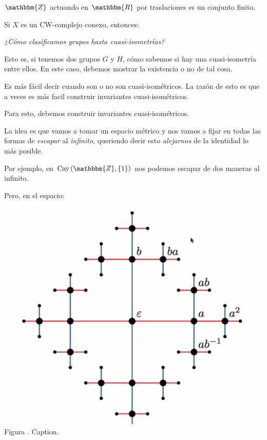 \documentclass[12pt]{report}
\newcounter{it}
\theoremstyle{largebreak}
\newcommand{\bbm}[1]{\ensuremath{\mathbbm{#1}}}
\newcounter{figcount}
\newcommand{\Cay}[1]{\ensuremath{\textup{Cay}\left(#1\right)}}
\begin{document}
    \begin{exa}
        $\bbm{Z}$ actuando en $\bbm{R}$ por traslaciones es un conjunto finito.
    \end{exa}

    \begin{exa}
        Si $X$ es un CW-complejo conexo, entonces:
    \end{exa}

    \begin{center}
        \textit{¿Cómo clasificamos grupos hasta cuasi-isometrías?}
    \end{center}

    Esto es, si tenemos dos grupos $G$ y $H$, cómo sabemos si hay una cuasi-isometría entre ellos. En este caso, debemos mostrar la existencia o no de tal cosa.

    Es más fácil decir cuando son o no son cuasi-isométricos. La razón de esto es que a veces es más facil construir invariantes cuasi-isométricos.

    Para esto, debemos construir invariantes cuasi-isométricos.

    La idea es que vamos a tomar un espacio métrico y nos vamos a fijar en todas las formas de \textit{escapar} al \textit{infinito}, queriendo decir esto \textit{alejarnos} de la identidad lo más posible.

    Por ejemplo, en $\Cay{\bbm{Z},\left\{1\right\}}$ nos podemos escapar de dos maneras al infinito.

    Pero, en el espacio:

    \begin{minipage}{\textwidth}
        \begin{center}
            \includegraphics[scale=0.3]{images/F_2.png}\\
            Figura \thefigcount. Caption.
        \end{center}
    \end{minipage}
\end{document}
